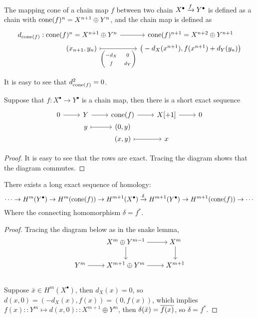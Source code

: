 \begin{definition}
  The {mapping cone} of a chain map $f$ between two chain $X^\bullet \xrightarrow{f} Y^\bullet$
  is defined as a chain with $\operatorname{cone}(f)^n = X^{n+1} \oplus Y^n$,
  and the chain map is defined as
  \[ \begin{tikzcd}[row sep=0, ampersand replacement=\&]
      d_{\cone(f)} : \&[-3em] \cone(f)^n = X^{n+1} \oplus Y^n \ar[r] \& \cone(f)^{n+1} = X^{n+2} \oplus Y^{n+1} \\
      \&[-3em] (x_{n+1}, y_n) \ar[r, mapsto, "{\begin{pmatrix} -d_X & 0 \\ f & d_Y \end{pmatrix}}"']
      \& \big(-d_X(x^{n+1}), f(x^{n+1}) + d_Y(y_n)\big) \\
    \end{tikzcd} \]
\end{definition}

It is easy to see that $d_{\operatorname{cone}(f)}^2 = 0$.

\begin{prop}
  Suppose that $f : X^\bullet \to Y^\bullet$ is a chain map,
  then there is a short exact sequence
  \[ \begin{tikzcd}[row sep=0pt]
      0 \ar[r] & Y \ar[r] & \cone(f) \ar[r] & X[+1] \ar[r] & 0 \\
      & y \ar[mapsto, r] & (0, y) & & \\
      & & (x, y) \ar[mapsto, r] & x & \\
    \end{tikzcd} \]

  \begin{proof}
    It is easy to see that the rows are exact.
    Tracing the diagram shows that the diagram commutes.
  \end{proof}
\end{prop}

\begin{coro}
  There exists a long exact sequence of homology:
  \[ \cdots \to H^{m}(Y^\bullet) \to H^{m}(\operatorname{cone}(f)) \to H^{m+1}(X^\bullet)
    \xrightarrow{\delta} H^{m+1}(Y^\bullet) \to H^{m+1}(\operatorname{cone}(f)) \to \cdots \]
  Where the connecting homomorphism $\delta = f^*$.

  \begin{proof}
    Tracing the diagram below as in the snake lemma,
    \[ \begin{tikzcd}[cramped]
        & X^{m} \oplus Y^{m-1} \ar[r] \ar[d] & X^{m} \ar[d] \\
        Y^{m} \ar[r] & X^{m+1} \oplus Y^{m} \ar[r]  & X^{m+1} \\
    \end{tikzcd} \]
  Suppose $\bar{x} \in H^m(X^\bullet)$, then $d_X(x) = 0$,
  so $d (x, 0) = (-d_X(x), f(x)) = (0, f(x))$, which implies
  $f(x) :: Y^m \mapsto d (x, 0) :: X^{m+1} \oplus Y^m$, then
  $\delta(\bar{x}) = \overline{f(x)}$, so $\delta = f^*$.
  \end{proof}
\end{coro}

